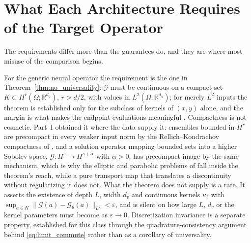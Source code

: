\section{What Each Architecture Requires of the Target Operator}
\label{sec:ch8-requirements}

The requirements differ more than the guarantees do, and they are where most misuse of the comparison begins.

For the generic neural operator the requirement is the one in Theorem~\ref{thm:no_universality}: $\mathcal{G}$ must be continuous on a compact set $K\subset H^r(\Omega;\mathbb{R}^{d_a})$, $r > d/2$, with values in $L^2(\Omega;\mathbb{R}^{d_u})$; for merely $L^2$ inputs the theorem is established only for the subclass of kernels of $(x,y)$ alone, and the margin is what makes the endpoint evaluations meaningful \cite{kovachki2023neural}. Compactness is not cosmetic. Part~I obtained it where the data supply it: ensembles bounded in $H^{r}$ are precompact in every weaker input norm by the Rellich--Kondrachov compactness of , and a solution operator mapping bounded sets into a higher Sobolev space, $\mathcal{G}:H^s\to H^{s+\alpha}$ with $\alpha>0$, has precompact image by the same mechanism, which is why the elliptic and parabolic problems of  fall inside the theorem's reach, while a pure transport map that translates a discontinuity without regularizing it does not.  What the theorem does not supply is a rate. It asserts the existence of depth $L$, width $d_v$ and continuous kernels $\kappa_\ell$ with $\sup_{a\in K}\|\mathcal{G}(a)-\mathcal{G}_\theta(a)\|_{L^2}<\varepsilon$, and is silent on how large $L$, $d_v$ or the kernel parameters must become as $\varepsilon\to0$. Discretization invariance is a separate property, established for this class through the quadrature-consistency argument behind \eqref{eq:limit_commute} rather than as a corollary of universality.

